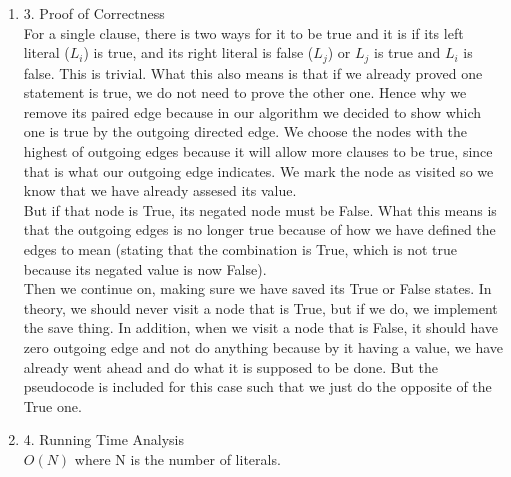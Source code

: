 \documentclass[11pt]{article}
\newenvironment{qparts}{\begin{enumerate}[{(}a{)}]}{\end{enumerate}}
\begin{document}
\begin{qparts}
\begin{verbatim}
      input edges into E
      Pair(X, Y)
  while nodes are not all marked:
  	N := node with most outgoing edge,
  	  if there are more than one, pick one randomly
  	if value(N) is null or True:
  	  value(N) = True
  	  mark(N)
  	  for all edge X outgoing from N:
  	    remove edge PairOf(X) // removes the edge that is paired with X
      Neg := negated node of N
      for all edge X outgoing from Neg:
        remove edge X
    if value(N) is False:
      for all edge X outgoing from N:
        remove edge X
      Neg := negated node of N
      for all edge X outgoing from Neg:
        remove edge PairOf(X)
  if NumberOfEdges(E) < NumberOfClauses(C):
    return "Not Possible"
  else:
    return "Possible!"

\end{verbatim}
\item[3.] Proof of Correctness \\
For a single clause, there is two ways for it to be true and it is if its left literal ($L_i$) is true, and its right literal is false ($L_j$) or $L_j$ is true and $L_i$ is false. This is trivial. What this also means is that if we already proved one statement is true, we do not need to prove the other one. Hence why we remove its paired edge because in our algorithm we decided to show which one is true by the outgoing directed edge. We choose the nodes with the highest of outgoing edges because it will allow more clauses to be true, since that is what our outgoing edge indicates. We mark the node as visited so we know that we have already assesed its value. \\

But if that node is True, its negated node must be False. What this means is that the outgoing edges is no longer true because of how we have defined the edges to mean (stating that the combination is True, which is not true because its negated value is now False). \\ 

Then we continue on, making sure we have saved its True or False states. In theory, we should never visit a node that is True, but if we do, we implement the save thing. In addition, when we visit a node that is False, it should have zero outgoing edge and not do anything because by it having a value, we have already went ahead and do what it is supposed to be done. But the pseudocode is included for this case such that we just do the opposite of the True one. 


\item[4.] Running Time Analysis \\
$O(N)$ where N is the number of literals. \\


\end{qparts}
\end{document}

